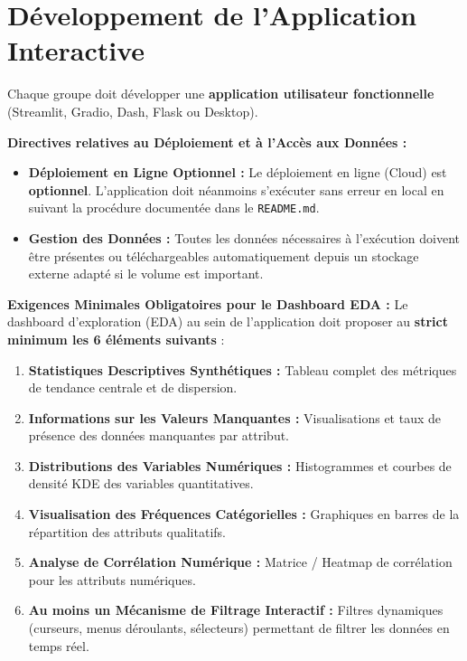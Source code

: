 \documentclass[11pt,a4paper]{article}
\begin{document}
\section{Développement de l'Application Interactive}

Chaque groupe doit développer une \textbf{application utilisateur fonctionnelle} (Streamlit, Gradio, Dash, Flask ou Desktop).

\textbf{Directives relatives au Déploiement et à l'Accès aux Données :}
\begin{itemize}[leftmargin=*]
    \item \textbf{Déploiement en Ligne Optionnel :} Le déploiement en ligne (Cloud) est \textbf{optionnel}. L'application doit néanmoins s'exécuter sans erreur en local en suivant la procédure documentée dans le \texttt{README.md}.
    \item \textbf{Gestion des Données :} Toutes les données nécessaires à l'exécution doivent être présentes ou téléchargeables automatiquement depuis un stockage externe adapté si le volume est important.
\end{itemize}

\textbf{Exigences Minimales Obligatoires pour le Dashboard EDA :}
Le dashboard d'exploration (EDA) au sein de l'application doit proposer au \textbf{strict minimum les 6 éléments suivants} :
\begin{enumerate}[leftmargin=*]
    \item \textbf{Statistiques Descriptives Synthétiques :} Tableau complet des métriques de tendance centrale et de dispersion.
    \item \textbf{Informations sur les Valeurs Manquantes :} Visualisations et taux de présence des données manquantes par attribut.
    \item \textbf{Distributions des Variables Numériques :} Histogrammes et courbes de densité KDE des variables quantitatives.
    \item \textbf{Visualisation des Fréquences Catégorielles :} Graphiques en barres de la répartition des attributs qualitatifs.
    \item \textbf{Analyse de Corrélation Numérique :} Matrice / Heatmap de corrélation pour les attributs numériques.
    \item \textbf{Au moins un Mécanisme de Filtrage Interactif :} Filtres dynamiques (curseurs, menus déroulants, sélecteurs) permettant de filtrer les données en temps réel.
\end{enumerate}
\end{document}
